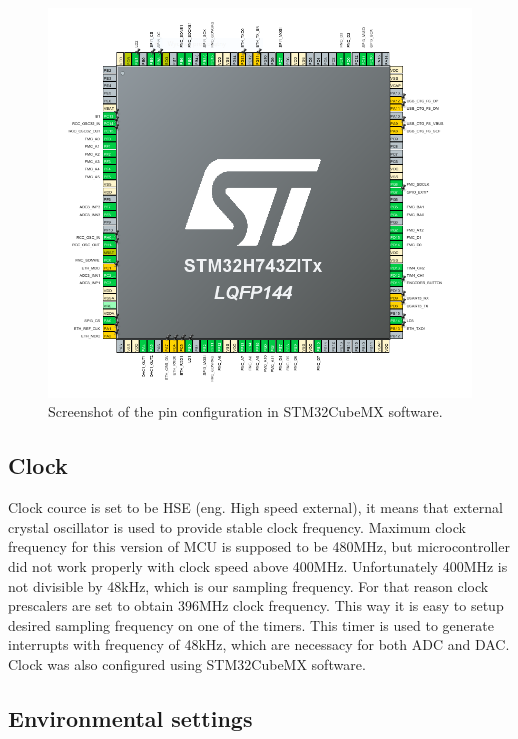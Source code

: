 \documentclass[a4paper,twoside,12pt]{book}
\begin{document}
\begin{figure}[H]
    \centering
    \includegraphics[width=\textwidth]{images/pin_overview}
    \caption{Screenshot of the pin configuration in STM32CubeMX software.}
    \label{fig:pins}
\end{figure}

\subsection{Clock}

Clock cource is set to be HSE (eng. High speed external),
it means that external crystal oscillator is used to
provide stable clock frequency.
Maximum clock frequency for this version of MCU is supposed to be 480MHz,
but microcontroller did not work properly with clock speed above 400MHz.
Unfortunately 400MHz is not divisible by 48kHz, which is our sampling frequency.
For that reason clock prescalers are set to obtain 396MHz clock frequency.
This way it is easy to setup desired sampling frequency on one of the timers.
This timer is used to generate interrupts with frequency of 48kHz,
which are necessacy for both ADC and DAC.
Clock was also configured using STM32CubeMX software.

\subsection{Environmental settings}
\end{document}
